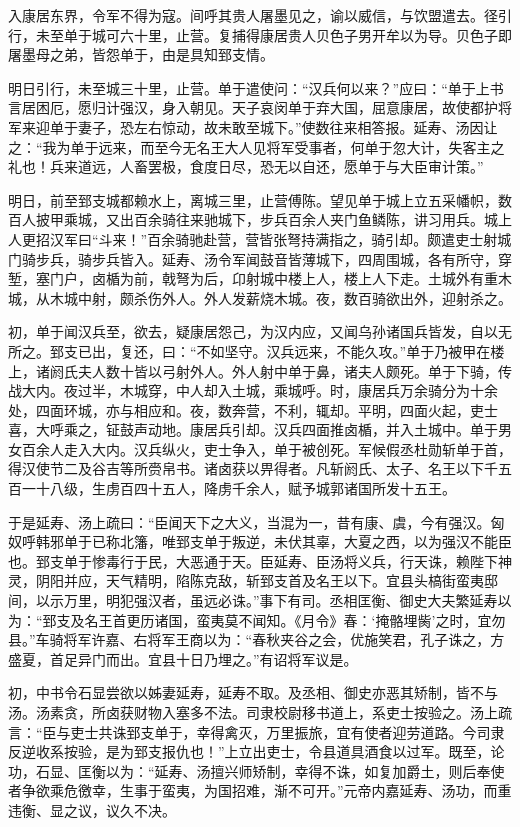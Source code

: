 \documentclass[12pt,UTF8]{ctexbook}
\begin{document}
入康居东界，令军不得为寇。间呼其贵人屠墨见之，谕以威信，与饮盟遣去。径引行，未至单于城可六十里，止营。复捕得康居贵人贝色子男开牟以为导。贝色子即屠墨母之弟，皆怨单于，由是具知郅支情。



明日引行，未至城三十里，止营。单于遣使问：“汉兵何以来？”应曰：“单于上书言居困厄，愿归计强汉，身入朝见。天子哀闵单于弃大国，屈意康居，故使都护将军来迎单于妻子，恐左右惊动，故未敢至城下。”使数往来相答报。延寿、汤因让之：“我为单于远来，而至今无名王大人见将军受事者，何单于忽大计，失客主之礼也！兵来道远，人畜罢极，食度日尽，恐无以自还，愿单于与大臣审计策。”



明日，前至郅支城都赖水上，离城三里，止营傅陈。望见单于城上立五采幡帜，数百人披甲乘城，又出百余骑往来驰城下，步兵百余人夹门鱼鳞陈，讲习用兵。城上人更招汉军曰“斗来！”百余骑驰赴营，营皆张弩持满指之，骑引却。颇遣吏士射城门骑步兵，骑步兵皆入。延寿、汤令军闻鼓音皆薄城下，四周围城，各有所守，穿堑，塞门户，卤楯为前，戟弩为后，卬射城中楼上人，楼上人下走。土城外有重木城，从木城中射，颇杀伤外人。外人发薪烧木城。夜，数百骑欲出外，迎射杀之。



初，单于闻汉兵至，欲去，疑康居怨己，为汉内应，又闻乌孙诸国兵皆发，自以无所之。郅支已出，复还，曰：“不如坚守。汉兵远来，不能久攻。”单于乃被甲在楼上，诸阏氏夫人数十皆以弓射外人。外人射中单于鼻，诸夫人颇死。单于下骑，传战大内。夜过半，木城穿，中人却入土城，乘城呼。时，康居兵万余骑分为十余处，四面环城，亦与相应和。夜，数奔营，不利，辄却。平明，四面火起，吏士喜，大呼乘之，钲鼓声动地。康居兵引却。汉兵四面推卤楯，并入土城中。单于男女百余人走入大内。汉兵纵火，吏士争入，单于被创死。军候假丞杜勋斩单于首，得汉使节二及谷吉等所赍帛书。诸卤获以畀得者。凡斩阏氏、太子、名王以下千五百一十八级，生虏百四十五人，降虏千余人，赋予城郭诸国所发十五王。



于是延寿、汤上疏曰：“臣闻天下之大义，当混为一，昔有康、虞，今有强汉。匈奴呼韩邪单于已称北籓，唯郅支单于叛逆，未伏其辜，大夏之西，以为强汉不能臣也。郅支单于惨毒行于民，大恶通于天。臣延寿、臣汤将义兵，行天诛，赖陛下神灵，阴阳并应，天气精明，陷陈克敌，斩郅支首及名王以下。宜县头槁街蛮夷邸间，以示万里，明犯强汉者，虽远必诛。”事下有司。丞相匡衡、御史大夫繁延寿以为：“郅支及名王首更历诸国，蛮夷莫不闻知。《月令》春：‘掩骼埋胔’之时，宜勿县。”车骑将军许嘉、右将军王商以为：“春秋夹谷之会，优施笑君，孔子诛之，方盛夏，首足异门而出。宜县十日乃埋之。”有诏将军议是。



初，中书令石显尝欲以姊妻延寿，延寿不取。及丞相、御史亦恶其矫制，皆不与汤。汤素贪，所卤获财物入塞多不法。司隶校尉移书道上，系吏士按验之。汤上疏言：“臣与吏士共诛郅支单于，幸得禽灭，万里振旅，宜有使者迎劳道路。今司隶反逆收系按验，是为郅支报仇也！”上立出吏士，令县道具酒食以过军。既至，论功，石显、匡衡以为：“延寿、汤擅兴师矫制，幸得不诛，如复加爵土，则后奉使者争欲乘危徼幸，生事于蛮夷，为国招难，渐不可开。”元帝内嘉延寿、汤功，而重违衡、显之议，议久不决。
\end{document}
